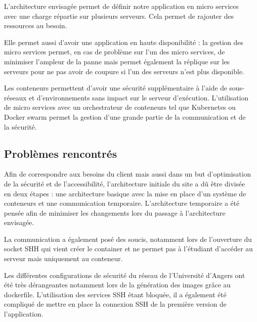 \par L'architecture envisagée permet de définir notre application en micro services avec une charge répartie sur plusieurs serveurs. Cela permet de rajouter des ressources au besoin. 
\par Elle permet aussi d’avoir une application en haute disponibilité : la gestion des micro services permet, en cas de problème sur l’un des micro services, de minimiser l'ampleur de la panne mais permet également la réplique sur les serveurs pour ne pas avoir de coupure si l’un des serveurs n’est plus disponible. 
\par Les conteneurs permettent d’avoir une sécurité supplémentaire à l’aide de sous-réseaux et d’environnements sans impact sur le serveur d’exécution. L’utilisation de micro services avec un orchestrateur de \gls{conteneur}s tel que Kubernetes ou Docker swarm permet la gestion d'une grande partie de la communication et de la sécurité.   

\subsection{Problèmes rencontrés} 

\par Afin de correspondre aux besoins du client mais aussi dans un but d'optimisation de la sécurité et de l'accessibilité, l’architecture initiale du site a dû être divisée en deux étapes : une architecture basique avec la mise en place d’un système de conteneurs et une communication temporaire. L’architecture temporaire a été pensée afin de minimiser les changements lors du passage à l’architecture envisagée. 
\par La communication a également posé des soucis, notamment lors de l’ouverture du socket SHH qui vient créer le container et ne permet pas à l’étudiant d'accéder au serveur mais uniquement au conteneur.

\par Les différentes configurations de sécurité du réseau de l’Université d’Angers ont été très dérangeantes notamment lors de la génération des images grâce au \gls{dockerfile}. L’utilisation des services SSH étant bloquée, il a également été compliqué de mettre en place la connexion SSH de la première version de l’application. 